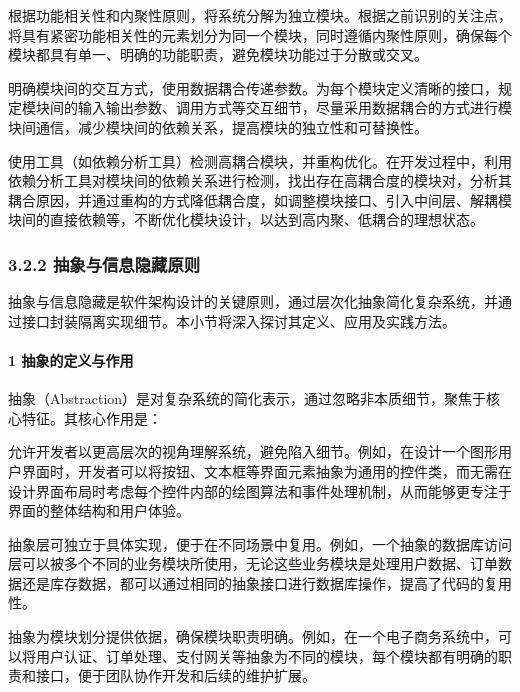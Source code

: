 根据功能相关性和内聚性原则，将系统分解为独立模块。根据之前识别的关注点，将具有紧密功能相关性的元素划分为同一个模块，同时遵循内聚性原则，确保每个模块都具有单一、明确的功能职责，避免模块功能过于分散或交叉。

明确模块间的交互方式，使用数据耦合传递参数。为每个模块定义清晰的接口，规定模块间的输入输出参数、调用方式等交互细节，尽量采用数据耦合的方式进行模块间通信，减少模块间的依赖关系，提高模块的独立性和可替换性。

使用工具（如依赖分析工具）检测高耦合模块，并重构优化。在开发过程中，利用依赖分析工具对模块间的依赖关系进行检测，找出存在高耦合度的模块对，分析其耦合原因，并通过重构的方式降低耦合度，如调整模块接口、引入中间层、解耦模块间的直接依赖等，不断优化模块设计，以达到高内聚、低耦合的理想状态。

\hypertarget{ux62bdux8c61ux4e0eux4fe1ux606fux9690ux85cfux539fux5219}{%
\subsubsection{3.2.2 抽象与信息隐藏原则}\label{ux62bdux8c61ux4e0eux4fe1ux606fux9690ux85cfux539fux5219}}

抽象与信息隐藏是软件架构设计的关键原则，通过层次化抽象简化复杂系统，并通过接口封装隔离实现细节。本小节将深入探讨其定义、应用及实践方法。

\hypertarget{ux62bdux8c61ux7684ux5b9aux4e49ux4e0eux4f5cux7528}{%
\paragraph{1 抽象的定义与作用}\label{ux62bdux8c61ux7684ux5b9aux4e49ux4e0eux4f5cux7528}}

抽象（Abstraction）是对复杂系统的简化表示，通过忽略非本质细节，聚焦于核心特征。其核心作用是：

允许开发者以更高层次的视角理解系统，避免陷入细节。例如，在设计一个图形用户界面时，开发者可以将按钮、文本框等界面元素抽象为通用的控件类，而无需在设计界面布局时考虑每个控件内部的绘图算法和事件处理机制，从而能够更专注于界面的整体结构和用户体验。

抽象层可独立于具体实现，便于在不同场景中复用。例如，一个抽象的数据库访问层可以被多个不同的业务模块所使用，无论这些业务模块是处理用户数据、订单数据还是库存数据，都可以通过相同的抽象接口进行数据库操作，提高了代码的复用性。

抽象为模块划分提供依据，确保模块职责明确。例如，在一个电子商务系统中，可以将用户认证、订单处理、支付网关等抽象为不同的模块，每个模块都有明确的职责和接口，便于团队协作开发和后续的维护扩展。

